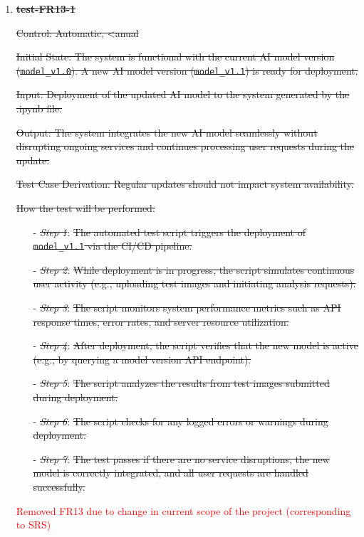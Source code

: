 \documentclass[12pt, titlepage]{article}
\begin{document}
\begin{enumerate}

\item \textbf{\sout{test-FR13-1}} \label{test-FR13-1}

\sout{Control: Automatic, <anual}

\sout{Initial State: The system is functional with the current AI model version (\texttt{model\_v1.0}). A new AI model version (\texttt{model\_v1.1}) is ready for deployment.}

\sout{Input: Deployment of the updated AI model to the system generated by the .ipynb file.}

\sout{Output: The system integrates the new AI model seamlessly without disrupting ongoing services and continues processing user requests during the update.}

\sout{Test Case Derivation: Regular updates should not impact system availability.}

\sout{How the test will be performed:}

\begin{itemize}
  \item[-] \textit{\sout{Step 1}}: \sout{The automated test script triggers the deployment of \texttt{model\_v1.1} via the CI/CD pipeline.}
  \item[-] \textit{\sout{Step 2}}: \sout{While deployment is in progress, the script simulates continuous user activity (e.g., uploading test images and initiating analysis requests).}
  \item[-] \textit{\sout{Step 3}}: \sout{The script monitors system performance metrics such as API response times, error rates, and server resource utilization.}
  \item[-] \textit{\sout{Step 4}}: \sout{After deployment, the script verifies that the new model is active (e.g., by querying a model version API endpoint).}
  \item[-] \textit{\sout{Step 5}}: \sout{The script analyzes the results from test images submitted during deployment.}
  \item[-] \textit{\sout{Step 6}}: \sout{The script checks for any logged errors or warnings during deployment.}
  \item[-] \textit{\sout{Step 7}}: \sout{The test passes if there are no service disruptions, the new model is correctly integrated, and all user requests are handled successfully.}
\end{itemize}

\textcolor{red}{Removed FR13 due to change in current scope of the project (corresponding to SRS)}

\end{enumerate}
\end{document}

